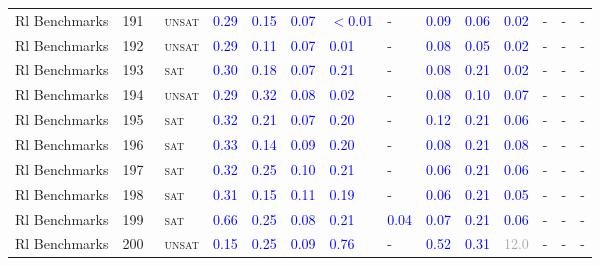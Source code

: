 \begin{center}
{\begin{longtable}{@{}llllllllllllll@{}}
Rl Benchmarks & 191 & ~\textsc{unsat} & \textcolor{blue}{0.29} & \textcolor{blue}{0.15} & \textcolor{blue}{0.07} & \textcolor{blue}{$<$0.01} & - & \textcolor{blue}{0.09} & \textcolor{blue}{0.06} & \textcolor{blue}{0.02} & - & - & - \\
Rl Benchmarks & 192 & ~\textsc{unsat} & \textcolor{blue}{0.29} & \textcolor{blue}{0.11} & \textcolor{blue}{0.07} & \textcolor{blue}{0.01} & - & \textcolor{blue}{0.08} & \textcolor{blue}{0.05} & \textcolor{blue}{0.02} & - & - & - \\
Rl Benchmarks & 193 & ~\textsc{sat} & \textcolor{blue}{0.30} & \textcolor{blue}{0.18} & \textcolor{blue}{0.07} & \textcolor{blue}{0.21} & - & \textcolor{blue}{0.08} & \textcolor{blue}{0.21} & \textcolor{blue}{0.02} & - & - & - \\
Rl Benchmarks & 194 & ~\textsc{unsat} & \textcolor{blue}{0.29} & \textcolor{blue}{0.32} & \textcolor{blue}{0.08} & \textcolor{blue}{0.02} & - & \textcolor{blue}{0.08} & \textcolor{blue}{0.10} & \textcolor{blue}{0.07} & - & - & - \\
Rl Benchmarks & 195 & ~\textsc{sat} & \textcolor{blue}{0.32} & \textcolor{blue}{0.21} & \textcolor{blue}{0.07} & \textcolor{blue}{0.20} & - & \textcolor{blue}{0.12} & \textcolor{blue}{0.21} & \textcolor{blue}{0.06} & - & - & - \\
Rl Benchmarks & 196 & ~\textsc{sat} & \textcolor{blue}{0.33} & \textcolor{blue}{0.14} & \textcolor{blue}{0.09} & \textcolor{blue}{0.20} & - & \textcolor{blue}{0.08} & \textcolor{blue}{0.21} & \textcolor{blue}{0.08} & - & - & - \\
Rl Benchmarks & 197 & ~\textsc{sat} & \textcolor{blue}{0.32} & \textcolor{blue}{0.25} & \textcolor{blue}{0.10} & \textcolor{blue}{0.21} & - & \textcolor{blue}{0.06} & \textcolor{blue}{0.21} & \textcolor{blue}{0.06} & - & - & - \\
Rl Benchmarks & 198 & ~\textsc{sat} & \textcolor{blue}{0.31} & \textcolor{blue}{0.15} & \textcolor{blue}{0.11} & \textcolor{blue}{0.19} & - & \textcolor{blue}{0.06} & \textcolor{blue}{0.21} & \textcolor{blue}{0.05} & - & - & - \\
Rl Benchmarks & 199 & ~\textsc{sat} & \textcolor{blue}{0.66} & \textcolor{blue}{0.25} & \textcolor{blue}{0.08} & \textcolor{blue}{0.21} & \textcolor{blue}{0.04} & \textcolor{blue}{0.07} & \textcolor{blue}{0.21} & \textcolor{blue}{0.06} & - & - & - \\
Rl Benchmarks & 200 & ~\textsc{unsat} & \textcolor{blue}{0.15} & \textcolor{blue}{0.25} & \textcolor{blue}{0.09} & \textcolor{blue}{0.76} & - & \textcolor{blue}{0.52} & \textcolor{blue}{0.31} & \textcolor{darkgray}{12.0} & - & - & - \\

\end{longtable}}
\end{center}
